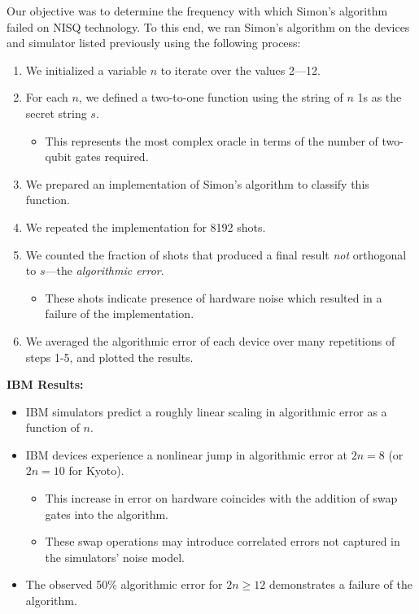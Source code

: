 \documentclass[portrait,a0b,final]{a0poster}
\newenvironment{poster}{
  \begin{center}
  \begin{minipage}[c]{0.98\textwidth}
}{
  \end{minipage} 
  \end{center}
}
\newenvironment{pcolumn}[1]{
  \begin{minipage}{#1\textwidth}
  \begin{center}
}{
  \end{center}
  \end{minipage}
}
\begin{document}
\begin{poster}
\begin{center}
\begin{pcolumn}{0.495}
{Our objective was to determine the frequency with which Simon's algorithm failed on NISQ technology.
To this end, we ran Simon's algorithm on the devices and simulator listed previously using the following process:
\begin{enumerate}
  \item We initialized a variable $n$ to iterate over the values 2—12.
  \item For each $n$, we defined a two-to-one function using the string of $n$ 1s as the secret string $s$.
  \begin{itemize}
    \item This represents the most complex oracle in terms of the number of two-qubit gates required.
  \end{itemize}
  \item We prepared an implementation of Simon's algorithm to classify this function.
  \item We repeated the implementation for 8192 shots.
  \item We counted the fraction of shots that produced a final result \textit{not} orthogonal to $s$---the \textit{algorithmic error}.
  \begin{itemize}
    \item These shots indicate presence of hardware noise which resulted in a failure of the implementation.
  \end{itemize}
  \item We averaged the algorithmic error of each device over many repetitions of steps 1-5, and plotted the results.
\end{enumerate}

\textbf{IBM Results:}
\begin{itemize}
  \item IBM simulators predict a roughly linear scaling in algorithmic error as a function of $n$.
  \item IBM devices experience a nonlinear jump in algorithmic error at $2n=8$ (or $2n=10$ for Kyoto).
  \begin{itemize}
    \item This increase in error on hardware coincides with the addition of swap gates into the algorithm.
    \item These swap operations may introduce correlated errors not captured in the simulators' noise model.
  \end{itemize}
  \item The observed 50\% algorithmic error for $2n\geq12$ demonstrates a failure of the algorithm.
\end{itemize}

}
\end{pcolumn}
\end{center}
\end{poster}
\end{document}
